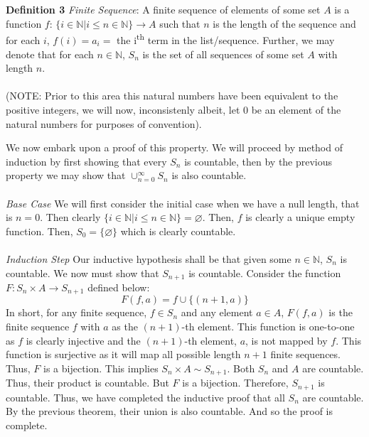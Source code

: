 \documentclass{article}
\begin{document}
\\
\\
\textbf{Definition 3} \textit{Finite Sequence}: A finite sequence of elements of some set $A$ is a function $f$: $\{i \in \mathbb{N} | i \leq n \in \mathbb{N}\} \to A$ such that $n$ is the length of the sequence and for each $i$, $f(i)=a_i=$ the i\textsuperscript{th} term in the list/sequence. Further, we may denote that for each $n \in \mathbb{N}$, $S_{n}$ is the set of all sequences of some set $A$ with length $n$. 
\\
\\
(NOTE: Prior to this area this natural numbers have been equivalent to the positive integers, we will now, inconsistenly albeit, let 0 be an element of the natural numbers for purposes of convention). 
\\
\par We now embark upon a proof of this property. We will proceed by method of induction by first showing that every $S_n$ is countable, then by the previous property we may show that $\cup_{n=0}^{\infty} S_{n}$ is also countable. 
\\
\\
\textit{Base Case} We will first consider the initial case when we have a null length, that is $n=0$. Then clearly $\{i \in \mathbb{N} | i \leq n \in \mathbb{N}\}=\varnothing$. Then, $f$ is clearly a unique empty function. Then, $S_{0}=\{\varnothing\}$ which is clearly countable. 
\\
\\
\textit{Induction Step} Our inductive hypothesis shall be that given some $n \in \mathbb{N}$, $S_{n}$ is countable. We now must show that $S_{n+1}$ is countable. Consider the function $F: S_n \times A \to S_{n+1}$ defined below:
\[
F(f,a)=f \cup \{(n+1,a)\}
\]
In short, for any finite sequence, $f \in S_{n}$ and any element $a \in A$, $F(f,a)$ is the finite sequence $f$ with $a$ as the $(n+1)$-th element. This function is one-to-one as $f$ is clearly injective and the $(n+1)$-th element, $a$, is not mapped by $f$. This function is surjective as it will map all possible length $n+1$ finite sequences. Thus, $F$ is a bijection. This implies $S_{n} \times A \sim S_{n+1}$. Both $S_{n}$ and $A$ are countable. Thus, their product is countable. But $F$ is a bijection. Therefore, $S_{n+1}$ is countable. Thus, we have completed the inductive proof that all $S_{n}$ are countable. By the previous theorem, their union is also countable. And so the proof is complete.
\end{document}
